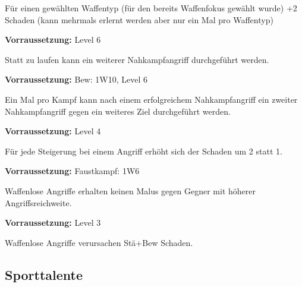 \documentclass[../../Heldenanleitung2]{subfiles}
\begin{document}
\begin{multicols}{2}
\begin{tcolorbox}[title={Waffenspezialisierung},colbacktitle=red, coltitle=black]
   Für einen gewählten Waffentyp (für den bereits Waffenfokus gewählt wurde) +2 Schaden (kann mehrmals erlernt werden aber nur ein Mal pro Waffentyp)
\end{tcolorbox}

\begin{tcolorbox}[title={Doppelangriff},colbacktitle=red, coltitle=black]  
	\textbf{Vorraussetzung:} Level 6
	\vspace{0.2cm}
	  
   Statt zu laufen kann ein weiterer Nahkampfangriff durchgeführt werden.
\end{tcolorbox}

\begin{tcolorbox}[title={Flüssige Bewegung},colbacktitle=red, coltitle=black]  
	\textbf{Vorraussetzung:} Bew: 1W10, Level 6
	\vspace{0.2cm}
	  
   Ein Mal pro Kampf kann nach einem erfolgreichem Nahkampfangriff ein zweiter Nahkampfangriff gegen ein weiteres Ziel durchgeführt werden.
\end{tcolorbox}

\begin{tcolorbox}[title={Gezielte Treffer},colbacktitle=red, coltitle=black]  
	\textbf{Vorraussetzung:} Level 4
	\vspace{0.2cm}
	  
    Für jede Steigerung bei einem Angriff erhöht sich der Schaden um 2 statt 1.
\end{tcolorbox}

\begin{tcolorbox}[title={Waffenloser Kampf},colbacktitle=red, coltitle=black]	  
	\textbf{Vorraussetzung:} Faustkampf: 1W6
	\vspace{0.2cm}
	
    Waffenlose Angriffe erhalten keinen Malus gegen Gegner mit höherer Angriffsreichweite.
\end{tcolorbox}

\begin{tcolorbox}[title={Schnelle Schläge},colbacktitle=red, coltitle=black]	  
	\textbf{Vorraussetzung:} Level 3
	\vspace{0.2cm}
	  
    Waffenlose Angriffe verursachen Stä+Bew Schaden.
\end{tcolorbox}
\end{multicols}

\subsection{Sporttalente}
\end{document}
